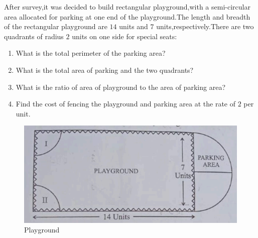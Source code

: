     After survey,it was decided to build rectangular playground,with a semi-circular area allocated for parking at one end of the playground.The length and breadth of the rectangular playground are $14$ units and $7$ units,respectively.There are two quadrants of radius $2$ units on one side for special seats:
            \begin{enumerate}
                \item What is the total perimeter of the parking area?
                \item What is the total area of parking and the two quadrants?
                \item What is the ratio of area of playground to the area of parking area?
                \item Find the cost of fencing the playground and parking area at the rate of \rupee $2$ per unit.
            \end{enumerate}
    \begin{figure}[!ht]
        \centering
        \includegraphics[width=\columnwidth]{figs/30-4-3-question36.png}
        \caption{Playground}
        \label{fig:enter-label2}
    \end{figure}
		
